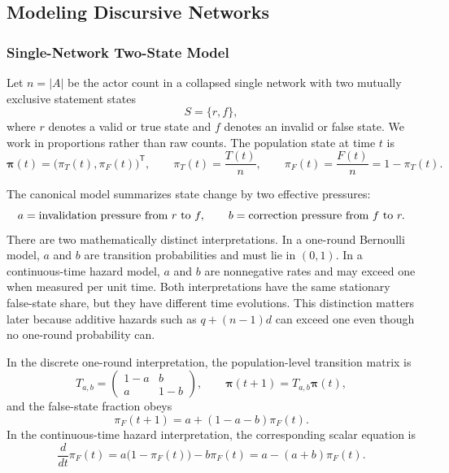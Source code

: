 \documentclass[12pt]{article}
\theoremstyle{definition}
\begin{document}

\subsection{Modeling Discursive Networks}\label{sec:modeling}

\subsubsection{Single-Network Two-State Model}
\label{sec:single-network-two-state}

Let $n=|A|$ be the actor count in a collapsed single network with two mutually
exclusive statement states
\[
    S=\{r,f\},
\]
where $r$ denotes a valid or true state and $f$ denotes an invalid or false
state.  We work in proportions rather than raw counts.  The population state at
time $t$ is
\[
\boldsymbol{\pi}(t)=\bigl(\pi_T(t),\pi_F(t)\bigr)^{\mathsf T},\qquad
\pi_T(t)=\frac{T(t)}{n},
\qquad
\pi_F(t)=\frac{F(t)}{n}=1-\pi_T(t).
\]

The canonical model summarizes state change by two effective pressures:
\[
    a=\hbox{invalidation pressure from }r\hbox{ to }f,
    \qquad
    b=\hbox{correction pressure from }f\hbox{ to }r.
\]
There are two mathematically distinct interpretations.  In a one-round
Bernoulli model, $a$ and $b$ are transition probabilities and must lie in
$(0,1)$.  In a continuous-time hazard model, $a$ and $b$ are nonnegative rates
and may exceed one when measured per unit time.  Both interpretations have the
same stationary false-state share, but they have different time evolutions.
This distinction matters later because additive hazards such as
$q+(n-1)d$ can exceed one even though no one-round probability can.

In the discrete one-round interpretation, the population-level transition
matrix is
\begin{equation}\label{eq:single-network-system1}
    T_{a,b}=\begin{pmatrix}
    1-a & b\\
    a   & 1-b
    \end{pmatrix},
    \qquad
    \boldsymbol{\pi}(t+1)=T_{a,b}\boldsymbol{\pi}(t),
\end{equation}
and the false-state fraction obeys
\begin{equation}\label{eq:false-recursion-ab}
    \pi_F(t+1)=a+(1-a-b)\pi_F(t).
\end{equation}
In the continuous-time hazard interpretation, the corresponding scalar equation
is
\begin{equation}\label{eq:false-ode-ab}
    \frac{d}{dt}\pi_F(t)=a\bigl(1-\pi_F(t)\bigr)-b\pi_F(t)
    =a-(a+b)\pi_F(t).
\end{equation}
\end{document}
